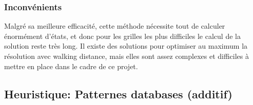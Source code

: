 \documentclass[a4paper, 12pt]{article}
\begin{document}
\subsubsection{Inconvénients}

Malgré sa meilleure efficacité, cette méthode nécessite tout de calculer énormément d'états, et donc pour les grilles les plus difficiles le calcul de la solution reste très long.
Il existe des solutions pour optimiser au maximum la résolution avec walking distance, mais elles sont assez complexes et difficiles à mettre en place dans le cadre de ce projet.

\subsection{Heuristique: Patternes databases (additif)}
\end{document}
